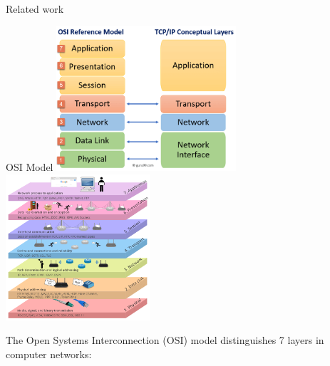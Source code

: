 \begin{frame}[fragile]{Related work}
\begin{block}{OSI Model}
\includegraphics[width=0.5\textwidth,height=0.3\textheight]{notes/../figures/osi-model-2.png}
\includegraphics[width=0.4\textwidth,height=0.3\textheight]{notes/../figures/osi-model-1.png}

The Open Systems Interconnection (OSI) model distinguishes 7 layers in
computer networks:

\newpage


\end{block}
\end{frame}
